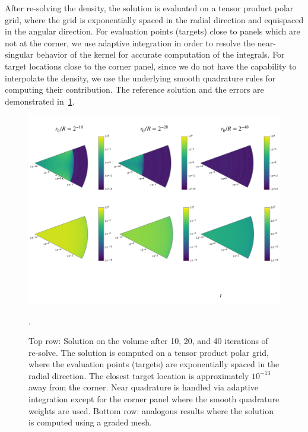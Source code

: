 After re-solving the density, the solution is evaluated on a tensor product polar grid, where the grid
is exponentially spaced in the radial direction and equispaced in the angular direction. For evaluation points (targets)
close to panels which are not at the corner, we use adaptive integration in order to resolve the near-singular behavior of
the kernel for accurate computation of the integrals. For target locations close to the corner panel, since we do not have
the capability to interpolate the density, we use the underlying smooth quadrature rules for computing their contribution. 
The reference solution and the errors are demonstrated in~\cref{fig:vol-plot}.
\begin{figure}
\begin{center}
\includegraphics[width=\linewidth]{paper-figs/volume}
\caption{Top row: Solution on the volume after 10, 20, and 40 iterations of re-solve. The solution is computed on a tensor product polar grid, where the evaluation points (targets) are exponentially spaced in the radial direction. The closest target location is approximately $10^{-13}$ away from the corner. Near quadrature is handled via adaptive integration except for the corner panel where the smooth quadrature weights are used. Bottom row: analogous results where the solution is computed using a graded mesh.   }.
\label{fig:vol-plot}
\end{center}
\end{figure}


